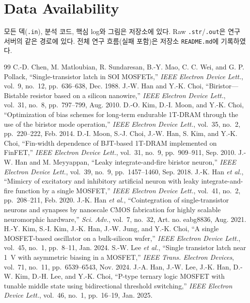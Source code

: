 \documentclass[journal]{IEEEtran}
\begin{document}
\section*{Data Availability}
모든 덱(\texttt{.in}), 분석 코드, 핵심 log와 그림은 저장소에 있다. Raw \texttt{.str}/\texttt{.out}은 연구 서버의 같은 경로에 있다. 전체 연구 흐름(실패 포함)은 저장소 \texttt{README.md}에 기록하였다.

\begin{thebibliography}{99}
 C.-D. Chen, M. Matloubian, R. Sundaresan, B.-Y. Mao, C. C. Wei, and G. P. Pollack, ``Single-transistor latch in SOI MOSFETs,'' \emph{IEEE Electron Device Lett.}, vol.~9, no.~12, pp.~636--638, Dec. 1988.
 J.-W. Han and Y.-K. Choi, ``Biristor---Bistable resistor based on a silicon nanowire,'' \emph{IEEE Electron Device Lett.}, vol.~31, no.~8, pp.~797--799, Aug. 2010.
 D.-O. Kim, D.-I. Moon, and Y.-K. Choi, ``Optimization of bias schemes for long-term endurable 1T-DRAM through the use of the biristor mode operation,'' \emph{IEEE Electron Device Lett.}, vol.~35, no.~2, pp.~220--222, Feb. 2014.
 D.-I. Moon, S.-J. Choi, J.-W. Han, S. Kim, and Y.-K. Choi, ``Fin-width dependence of BJT-based 1T-DRAM implemented on FinFET,'' \emph{IEEE Electron Device Lett.}, vol.~31, no.~9, pp.~909--911, Sep. 2010.
 J.-W. Han and M. Meyyappan, ``Leaky integrate-and-fire biristor neuron,'' \emph{IEEE Electron Device Lett.}, vol.~39, no.~9, pp.~1457--1460, Sep. 2018.
 J.-K. Han \emph{et al.}, ``Mimicry of excitatory and inhibitory artificial neuron with leaky integrate-and-fire function by a single MOSFET,'' \emph{IEEE Electron Device Lett.}, vol.~41, no.~2, pp.~208--211, Feb. 2020.
 J.-K. Han \emph{et al.}, ``Cointegration of single-transistor neurons and synapses by nanoscale CMOS fabrication for highly scalable neuromorphic hardware,'' \emph{Sci. Adv.}, vol.~7, no.~32, Art. no. eabg8836, Aug. 2021.
 H.-Y. Kim, S.-I. Kim, J.-K. Han, J.-W. Jung, and Y.-K. Choi, ``A single MOSFET-based oscillator on a bulk-silicon wafer,'' \emph{IEEE Electron Device Lett.}, vol.~45, no.~1, pp.~8--11, Jan. 2024.
 S.-W. Lee \emph{et al.}, ``Single transistor latch near 1~V with asymmetric biasing in a MOSFET,'' \emph{IEEE Trans. Electron Devices}, vol.~71, no.~11, pp.~6539--6543, Nov. 2024.
 J.-A. Han, J.-W. Lee, J.-K. Han, D.-W. Kim, D.-H. Lee, and Y.-K. Choi, ``P-type ternary logic MOSFET with tunable middle state using bidirectional threshold switching,'' \emph{IEEE Electron Device Lett.}, vol.~46, no.~1, pp.~16--19, Jan. 2025.

\end{thebibliography}
\end{document}
